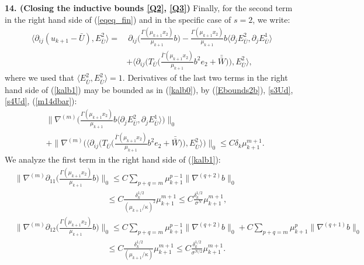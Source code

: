 \documentclass[reqno,twoside,11pt]{amsart}
\newcommand*{\dbar}[1]{\bar{\bar{#1}}}
\numberwithin{equation}{section}
\theoremstyle{plain}
\theoremstyle{definition}
\begin{document}
{\bf 14. (Closing the inductive bounds \ref{Q2}, \ref{Q3})}
Finally, for the second term in the right hand side of (\ref{eqeq_fin}) and in the
specific case of $s=2$, we write:
\begin{equation}\label{kalb1}
\begin{split}
\langle\partial_{ij}(u_{k+1}-\bar U), E^2_{\bar U} \rangle = & ~\partial_{ij}
\Big(\frac{\Gamma(\mu_{k+1}x_2)}{\mu_{k+1}}
b\Big) - \frac{\Gamma(\mu_{k+1}x_2)}{\mu_{k+1}} b
\langle \partial_{j}E^2_{\bar U},
\partial_j E^1_{\bar U}\rangle \\ & + \Big\langle \partial_{ij}\Big(T_{\bar U}\Big(\frac{\bar\Gamma(\mu_{k+1}
 x_2)}{\mu_{k+1}}b^2e_2+\dbar W\Big)\Big), E^2_{\bar U}\Big\rangle,
\end{split}
\end{equation}
where we used that $\langle E^2_{\bar U}, E^2_{\bar U} \rangle = 1$.
Derivatives of the last two terms in the right hand side of (\ref{kalb1}) may be
bounded as in (\ref{kalb0}),  by (\ref{Ebounds2b}), \ref{s3Ud},
\ref{s4Ud}, (\ref{m14dbar}):
\begin{equation}\label{kalb2}
\begin{split}
& \big\|\nabla^{(m)}\Big(\frac{\Gamma(\mu_{k+1}x_2)}{\mu_{k+1}} b
\langle \partial_{j}E^2_{\bar U},
\partial_j E^1_{\bar U}\rangle\Big)\big\|_0 \\ & +
\big\|\nabla^{(m)}\Big(\Big\langle \partial_{ij}\Big(T_{\bar
  U}\Big(\frac{\bar\Gamma(\mu_{k+1} 
 x_2)}{\mu_{k+1}}b^2e_2+\dbar W\Big)\Big), E^2_{\bar
 U}\Big\rangle\Big)\big\|_0 \leq C\delta_k\mu_{k+1}^{m+1}.
\end{split}
\end{equation}
We analyze the first term in the right hand side of (\ref{kalb1}):
\begin{equation}\label{kalb3}
\begin{split}
& \big\|\nabla^{(m)}\partial_{11} \Big(\frac{\Gamma(\mu_{k+1}x_2)}{\mu_{k+1}}
b\Big)\big\|_0\leq C\sum_{p+q=m}\mu_{k+1}^{p-1}\|\nabla^{(q+2)}b\|_0
\\ & \qquad\qquad\qquad \qquad\qquad\quad \; \leq C \frac{\delta_k^{1/2}}
{(\mu_{k+1}/\kappa)^2}\mu_{k+1}^{m+1}\leq C \frac{\delta_k^{1/2}}{\sigma^{N}}\mu_{k+1}^{m+1},
\\ & \big\|\nabla^{(m)}\partial_{12} \Big(\frac{\Gamma(\mu_{k+1}x_2)}{\mu_{k+1}}
b\Big)\big\|_0 \leq C\sum_{p+q=m}\mu_{k+1}^{p-1}\|\nabla^{(q+2)}b\|_0
+ C\sum_{p+q=m}\mu_{k+1}^{p}\|\nabla^{(q+1)}b\|_0
\\ & \qquad\qquad\qquad \qquad\qquad\quad \; 
\leq C \frac{\delta_k^{1/2}} {(\mu_{k+1}/\kappa)}\mu_{k+1}^{m+1}\leq C
\frac{\delta_k^{1/2}}{\sigma^{N/2}}\mu_{k+1}^{m+1}.
\end{split}
\end{equation}
\end{document}
